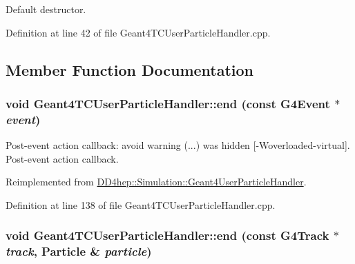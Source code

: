 Default destructor. 

Definition at line 42 of file Geant4TCUserParticleHandler.cpp.

\subsection{Member Function Documentation}
\hypertarget{class_d_d4hep_1_1_simulation_1_1_geant4_t_c_user_particle_handler_ac51009a6e712d2b52d2470a5a1a7a03d}{
\subsubsection[{end}]{\setlength{\rightskip}{0pt plus 5cm}void Geant4TCUserParticleHandler::end (const G4Event $\ast$ {\em event})}}
\label{class_d_d4hep_1_1_simulation_1_1_geant4_t_c_user_particle_handler_ac51009a6e712d2b52d2470a5a1a7a03d}


Post-\/event action callback: avoid warning (...) was hidden \mbox{[}-\/Woverloaded-\/virtual\mbox{]}. Post-\/event action callback. 

Reimplemented from \hyperlink{class_d_d4hep_1_1_simulation_1_1_geant4_user_particle_handler_a44c00d22c0fba91cf4a32db049728805}{DD4hep::Simulation::Geant4UserParticleHandler}.

Definition at line 138 of file Geant4TCUserParticleHandler.cpp.\hypertarget{class_d_d4hep_1_1_simulation_1_1_geant4_t_c_user_particle_handler_a1578be1e99f7f70c9d332cffb1ad2504}{
\subsubsection[{end}]{\setlength{\rightskip}{0pt plus 5cm}void Geant4TCUserParticleHandler::end (const G4Track $\ast$ {\em track}, \/  {\bf Particle} \& {\em particle})}}
\label{class_d_d4hep_1_1_simulation_1_1_geant4_t_c_user_particle_handler_a1578be1e99f7f70c9d332cffb1ad2504}


